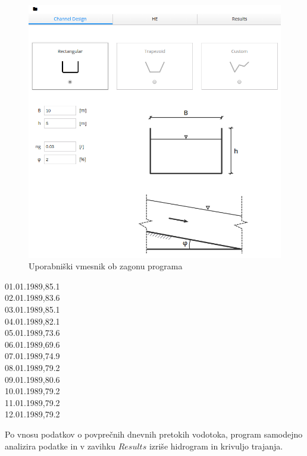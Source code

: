 \begin{figure}[htp!]
	\begin{centering}
		\includegraphics[width=\textwidth]{slike/opis/frontpage.png}		
		\caption{Uporabniški vmesnik ob zagonu programa}\label{fig:opis_frontpage}
	\end{centering}
\end{figure}

\begin{center}
01.01.1989,85.1\\
02.01.1989,83.6\\
03.01.1989,85.1\\
04.01.1989,82.1\\
05.01.1989,73.6\\
06.01.1989,69.6\\
07.01.1989,74.9\\
08.01.1989,79.2\\
09.01.1989,80.6\\
10.01.1989,79.2\\
11.01.1989,79.2\\
12.01.1989,79.2\\
\end{center}

Po vnosu podatkov o povprečnih dnevnih pretokih vodotoka, program samodejno analizira podatke in v zavihku $Results$ izriše hidrogram in krivuljo trajanja.

